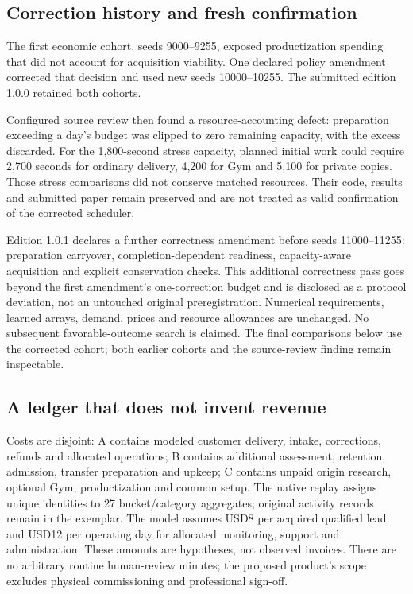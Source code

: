 \documentclass[11pt,letterpaper]{article}
\begin{document}
\subsection{Correction history and fresh confirmation}

The first economic cohort, seeds 9000--9255, exposed productization spending that did not account for acquisition viability. One declared policy amendment corrected that decision and used new seeds 10000--10255. The submitted edition 1.0.0 retained both cohorts.

Configured source review then found a resource-accounting defect: preparation exceeding a day's budget was clipped to zero remaining capacity, with the excess discarded. For the 1,800-second stress capacity, planned initial work could require 2,700 seconds for ordinary delivery, 4,200 for Gym and 5,100 for private copies. Those stress comparisons did not conserve matched resources. Their code, results and submitted paper remain preserved and are not treated as valid confirmation of the corrected scheduler.

Edition 1.0.1 declares a further correctness amendment before seeds 11000--11255: preparation carryover, completion-dependent readiness, capacity-aware acquisition and explicit conservation checks. This additional correctness pass goes beyond the first amendment's one-correction budget and is disclosed as a protocol deviation, not an untouched original preregistration. Numerical requirements, learned arrays, demand, prices and resource allowances are unchanged. No subsequent favorable-outcome search is claimed. The final comparisons below use the corrected cohort; both earlier cohorts and the source-review finding remain inspectable.

\subsection{A ledger that does not invent revenue}

Costs are disjoint: A contains modeled customer delivery, intake, corrections, refunds and allocated operations; B contains additional assessment, retention, admission, transfer preparation and upkeep; C contains unpaid origin research, optional Gym, productization and common setup. The native replay assigns unique identities to 27 bucket/category aggregates; original activity records remain in the exemplar. The model assumes USD8 per acquired qualified lead and USD12 per operating day for allocated monitoring, support and administration. These amounts are hypotheses, not observed invoices. There are no arbitrary routine human-review minutes; the proposed product's scope excludes physical commissioning and professional sign-off.
\end{document}
